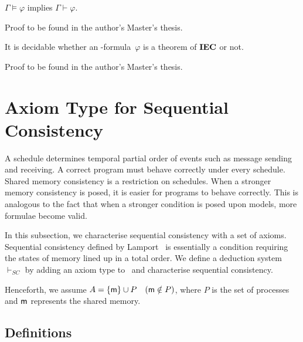 \begin{proposition}
 \label{strong-completeness}
 $\Gamma\models\varphi$ implies $\Gamma\vdash\varphi$.
\end{proposition}
Proof to be found in the author's Master's thesis.

\begin{proposition}[Decidability]
 \label{decidability}
 It is decidable whether an \iec-formula~$\varphi$ is a theorem of ${\rm {\textbf{IEC}}}$ or not.
\end{proposition}
Proof to be found in the author's Master's thesis.

  \section{Axiom Type for Sequential Consistency}
  \label{sc}

 A schedule determines temporal partial order of events such as
 message sending and receiving.
 A correct program must behave correctly under every schedule.
 Shared memory consistency is a restriction on schedules.
 When a stronger memory consistency is posed, it is easier for programs to behave
 correctly.  This is analogous to the fact
 that when a stronger condition
 is posed upon models, more formulae become valid.

 In this subsection, we characterise sequential consistency with a set of axioms.
 Sequential consistency defined by Lamport~\cite{lamport1979make} is essentially a condition requiring the states of memory lined up
 in a total order.
 We define a deduction system $\vdash_{SC}$ by adding an axiom type to \iec\, and
 characterise sequential consistency.

 Henceforth, we assume $A = \{{\sf m}\}\cup P\quad ({\sf m}\notin P)$, where $P$ is the
 set of processes and ${\sf m}$ represents the shared memory.

  \subsection{Definitions}

